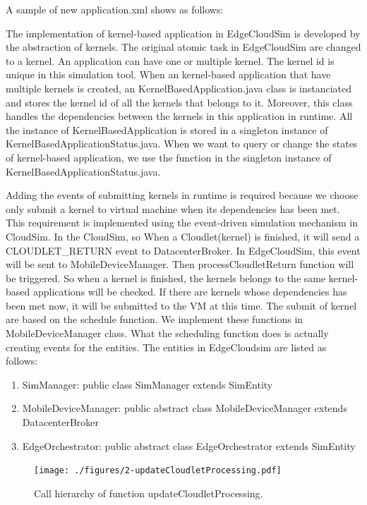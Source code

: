 A sample of new application.xml shows as follows:



The implementation of kernel-based application in EdgeCloudSim is developed by the abstraction of kernels. The original atomic task in EdgeCloudSim are changed to a kernel. An application can have one or multiple kernel. The kernel id is unique in this simulation tool. When an kernel-based application that have multiple kernels is created, an KernelBasedApplication.java class is instanciated and stores the kernel id of all the kernels that belongs to it. Moreover, this class handles the dependencies between the kernels in this application in runtime. All the instance of KernelBasedApplication is stored in a singleton instance of KernelBasedApplicationStatus.java. When we want to query or change the states of kernel-based application, we use the function in the singleton instance of KernelBasedApplicationStatus.java.

Adding the events of submitting kernels in runtime is required because we choose only submit a kernel to virtual machine when its dependencies has been met. This requirement is implemented using the event-driven simulation mechanism in CloudSim. In the CloudSim, so  When a Cloudlet(kernel) is finished, it will send a CLOUDLET\_RETURN event to DatacenterBroker. In EdgeCloudSim, this event will be sent to MobileDeviceManager. Then processCloudletReturn function will be triggered. So when a kernel is finished, the kernels belongs to the same kernel-based applications will be checked. If there are kernels whose dependencies has been met now, it will be submitted to the VM at this time. The submit of kernel are based on the schedule function. We implement these functions in MobileDeviceManager class. What the scheduling function does is actually creating events for the entities. The entities in EdgeCloudsim are listed as follows:
\begin{enumerate}
	\item SimManager: public class SimManager extends SimEntity
	\item MobileDeviceManager: public abstract class MobileDeviceManager  extends DatacenterBroker
	\item EdgeOrchestrator: public abstract class EdgeOrchestrator extends SimEntity
\end{enumerate}


\begin{figure}
	\centering
	\texttt{[image: ./figures/2-updateCloudletProcessing.pdf]}
	\caption{\label{fig:cloudletProcessing}Call hierarchy of function updateCloudletProcessing.}
\end{figure}

